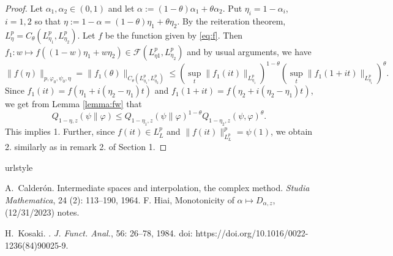 \documentclass[12pt]{article}
\theoremstyle{definition}
\theoremstyle{remark}
\def\Fe{\mathcal F}
\begin{document}
\begin{proof} Let $\alpha_1,\alpha_2\in (0,1)$ and let
$\alpha:=(1-\theta)\alpha_1+\theta\alpha_2$. Put $\eta_i=1-\alpha_i$, $i=1,2$ so that
$\eta:=1-\alpha=(1-\theta)\eta_1+\theta\eta_2$. By the reiteration theorem,
$L^p_\eta=C_\theta(L^p_{\eta_1},L^p_{\eta_2})$. Let $f$ be the function given by
\eqref{eq:f}. Then $f_1:w\mapsto f((1-w)\eta_1+w\eta_2)\in \Fe(L^p_{\eta1},L^p_{\eta_2})$ and
by usual arguments, we have
\[
\|f(\eta)\|_{p,\varphi_0,\psi_0,\eta}=\|f_1(\theta)\|_{C_\theta(L^p_{\eta_1},L^p_{\eta_2})}\le 
(\sup_t\|f_1(it)\|_{L^p_{\eta_1}})^{1-\theta}(\sup_t\|f_1(1+it)\|_{L^p_{\eta_1}})^\theta.
\]
Since $f_1(it)=f(\eta_1+i(\eta_2-\eta_1)t)$ and $f_1(1+it)=f(\eta_2+i(\eta_2-\eta_1)t)$,
we get from Lemma \ref{lemma:fw} that
\[
Q_{1-\eta,z}(\psi\|\varphi)\le
Q_{1-\eta_1,z}(\psi\|\varphi)^{1-\theta}Q_{1-\eta_2,z}(\psi,\varphi)^\theta.
\]
This implies 1. Further, since $f(it)\in L^p_L$ and $\|f(it)\|_{L^p_L}^p=\psi(1)$, we
obtain 2. similarly as in remark 2. of Section 1.


\end{proof}

\begin{thebibliography}{2}
\providecommand{\natexlab}[1]{#1}
\providecommand{\url}[1]{\texttt{#1}}
\expandafter\ifx\csname urlstyle\endcsname\relax
  \providecommand{\doi}[1]{doi: #1}\else
  \providecommand{\doi}{doi: \begingroup \urlstyle{rm}\Url}\fi

A.~Calderón.
\newblock Intermediate spaces and interpolation, the complex method.
\newblock \emph{Studia Mathematica}, 24 (2): 113--190, 1964.
 F. Hiai, Monotonicity of $\alpha\mapsto D_{\alpha,z}$, (12/31/2023)
notes.


H.~Kosaki.
.
\newblock \emph{{J. Funct. Anal.}}, {56}: {26--78}, {1984}.
\newblock \doi{https://doi.org/10.1016/0022-1236(84)90025-9}.

\end{thebibliography}



%
%
\end{document}
